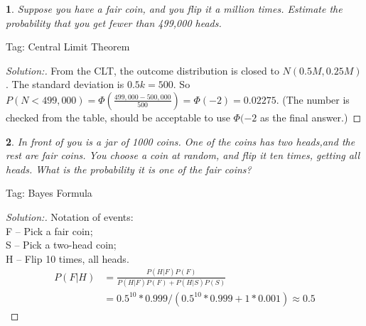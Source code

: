 \documentclass[10pt]{report}
\newtheorem{exe}{}[chapter]
\newenvironment{sol}{\begin{proof}[Solution:]}{\end{proof}}
\begin{document}
\begin{exe}
Suppose you have a fair coin, and you flip it a million times. Estimate the probability that you get fewer than 499,000 heads.
\end{exe}
\begin{teacher}
Tag: Central Limit Theorem
\begin{sol}
From the CLT, the outcome distribution is closed to $N(0.5M, 0.25M)$. The standard deviation is $0.5k=500$. So $P(N<499,000) = \Phi(\frac{499,000 - 500, 000}{500}) = \Phi(-2) = 0.02275$. (The number is checked from the table, should be acceptable to use $\Phi(-2$ as the final answer.)
\end{sol}
\end{teacher}

\begin{exe}
In front of you is a jar of 1000 coins. One of the coins has two heads,and the rest are fair coins. You choose a coin at random, and flip it ten times, getting all heads. What is the probability it is one of the fair coins?
\end{exe}
\begin{teacher}
Tag: Bayes Formula
\begin{sol} 
Notation of events:\\
F -- Pick a fair coin;\\
S -- Pick a two-head coin;\\
H -- Flip 10 times, all heads.\\
\begin{equation*}
\begin{split}
    P(F|H) &= \frac{P(H|F)P(F)}{P(H|F)P(F) + P(H|S)P(S)}\\
    & = 0.5^{10}*0.999/(0.5^{10}*0.999+1*0.001) \approx 0.5
\end{split}
\end{equation*}
\end{sol}
\end{teacher}
\end{document}
